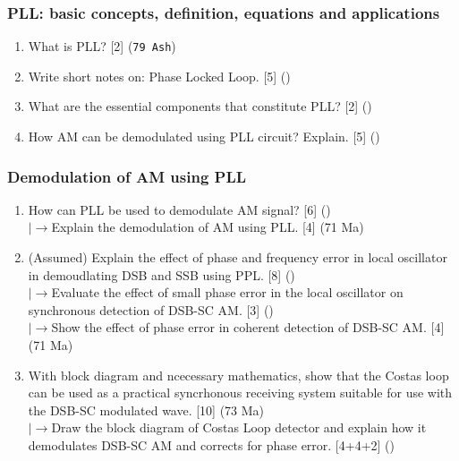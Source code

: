 \documentclass[12pt]{article}
\newcommand{\lb}{\\$\left|\rightarrow\right.$}
\begin{document}
    \subsubsection{PLL: basic concepts, definition, equations and applications}
      \begin{enumerate}
        \item What is PLL? \hfill [2] (\texttt{79 Ash})

        \item Write short notes on: Phase Locked Loop. \hfill [5] ()

        \item What are the essential components that constitute PLL? \hfill [2] ()

        \item How AM can be demodulated using PLL circuit? Explain. \hfill [5] ()
      \end{enumerate}

    \subsubsection{Demodulation of AM using PLL}
      \begin{enumerate}
        \item How can PLL be used to demodulate AM signal? \hfill [6] ()
        \lb Explain the demodulation of AM using PLL. \hfill [4] (71 Ma)

        \item (Assumed) Explain the effect of phase and frequency error in local oscillator in demoudlating DSB and SSB using PPL. \hfill [8] ()
        \lb Evaluate the effect of small phase error in the local oscillator on synchronous detection of DSB-SC AM. \hfill [3] ()
        \lb Show the effect of phase error in coherent detection of DSB-SC AM. \hfill [4] (71 Ma)

        \item With block diagram and ncecessary mathematics, show that the Costas loop can be used as a practical syncrhonous receiving system suitable for use with the DSB-SC modulated wave. \hfill [10] (73 Ma)
        \lb Draw the block diagram of Costas Loop detector and explain how it demodulates DSB-SC AM and corrects for phase error. \hfill [4+4+2] ()
      \end{enumerate}
\end{document}
